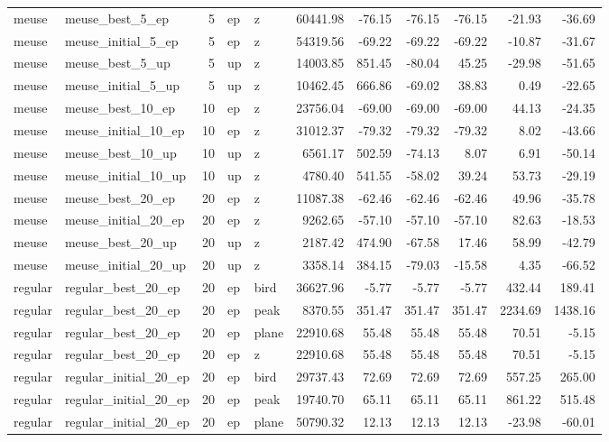 \begin{tabular}{llrllrrrrrr}
    meuse & meuse_best_5_ep & 5 & ep & z & 60441.98 & -76.15 & -76.15 & -76.15 & -21.93 & -36.69 \\
    meuse & meuse_initial_5_ep & 5 & ep & z & 54319.56 & -69.22 & -69.22 & -69.22 & -10.87 & -31.67 \\
    meuse & meuse_best_5_up & 5 & up & z & 14003.85 & 851.45 & -80.04 & 45.25 & -29.98 & -51.65 \\
    meuse & meuse_initial_5_up & 5 & up & z & 10462.45 & 666.86 & -69.02 & 38.83 & 0.49 & -22.65 \\
    meuse & meuse_best_10_ep & 10 & ep & z & 23756.04 & -69.00 & -69.00 & -69.00 & 44.13 & -24.35 \\
    meuse & meuse_initial_10_ep & 10 & ep & z & 31012.37 & -79.32 & -79.32 & -79.32 & 8.02 & -43.66 \\
    meuse & meuse_best_10_up & 10 & up & z & 6561.17 & 502.59 & -74.13 & 8.07 & 6.91 & -50.14 \\
    meuse & meuse_initial_10_up & 10 & up & z & 4780.40 & 541.55 & -58.02 & 39.24 & 53.73 & -29.19 \\
    meuse & meuse_best_20_ep & 20 & ep & z & 11087.38 & -62.46 & -62.46 & -62.46 & 49.96 & -35.78 \\
    meuse & meuse_initial_20_ep & 20 & ep & z & 9262.65 & -57.10 & -57.10 & -57.10 & 82.63 & -18.53 \\
    meuse & meuse_best_20_up & 20 & up & z & 2187.42 & 474.90 & -67.58 & 17.46 & 58.99 & -42.79 \\
    meuse & meuse_initial_20_up & 20 & up & z & 3358.14 & 384.15 & -79.03 & -15.58 & 4.35 & -66.52 \\
    regular & regular_best_20_ep & 20 & ep & bird & 36627.96 & -5.77 & -5.77 & -5.77 & 432.44 & 189.41 \\
    regular & regular_best_20_ep & 20 & ep & peak & 8370.55 & 351.47 & 351.47 & 351.47 & 2234.69 & 1438.16 \\
    regular & regular_best_20_ep & 20 & ep & plane & 22910.68 & 55.48 & 55.48 & 55.48 & 70.51 & -5.15 \\
    regular & regular_best_20_ep & 20 & ep & z & 22910.68 & 55.48 & 55.48 & 55.48 & 70.51 & -5.15 \\
    regular & regular_initial_20_ep & 20 & ep & bird & 29737.43 & 72.69 & 72.69 & 72.69 & 557.25 & 265.00 \\
    regular & regular_initial_20_ep & 20 & ep & peak & 19740.70 & 65.11 & 65.11 & 65.11 & 861.22 & 515.48 \\
    regular & regular_initial_20_ep & 20 & ep & plane & 50790.32 & 12.13 & 12.13 & 12.13 & -23.98 & -60.01 \\

\end{tabular}

